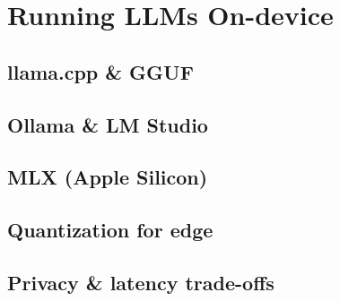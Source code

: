 
\section{Running LLMs On-device}

\subsection{llama.cpp \& GGUF}


\subsection{Ollama \& LM Studio}


\subsection{MLX (Apple Silicon)}


\subsection{Quantization for edge}


\subsection{Privacy \& latency trade-offs}


